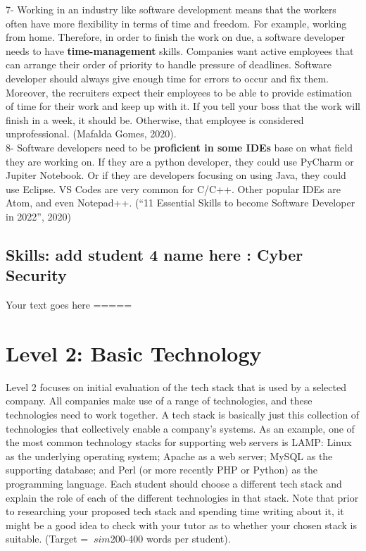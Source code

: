 \documentclass[a4paper, 11pt]{report}
\begin{document}
	7- Working in an industry like software development means that the workers often have more flexibility in terms of time and freedom. For example, working from home. Therefore, in order to finish the work on due, a software developer needs to have \textbf{time-management} skills. Companies want active employees that can arrange their order of priority to handle pressure of deadlines. Software developer should always give enough time for errors to occur and fix them. Moreover, the recruiters expect their employees to be able to provide estimation of time for their work and keep up with it. If you tell your boss that the work will finish in a week, it should be. Otherwise, that employee is considered unprofessional. (Mafalda Gomes, 2020). \nocite{one_seven}\\
	
	8- Software developers need to be \textbf{proficient in some IDEs} base on what field they are working on. If they are a python developer, they could use PyCharm or Jupiter Notebook. Or if they are developers focusing on using Java, they could use Eclipse. VS Codes are very common for C/C++. Other popular IDEs are Atom, and even Notepad++.  (“11 Essential Skills to become Software Developer in 2022”, 2020)\\
	
	\newpage
	\setlength{}
	
	
	
	
	

	
	\newpage
	\subsection{Skills: add student 4 name here : Cyber Security}
	Your text goes here
	=====
	\newpage
	\section{Level 2: Basic Technology}
	Level 2 focuses on initial evaluation of the tech stack that is used by a selected 
	company. All companies make use of a range of technologies, and these technologies 
	need to work together. A tech stack is basically just this collection of 
	technologies that collectively enable a company's systems. As an example, one of 
	the most common technology stacks for supporting web servers is LAMP: Linux as the 
	underlying operating system; Apache as a web server; MySQL as the supporting 
	database; and Perl (or more recently PHP or Python) as the programming language.
	Each student should choose a different tech stack and explain the role of each of 
	the different technologies in that stack. Note that prior to researching your 
	proposed tech stack and spending time writing about it, it might be a good idea to 
	check with your tutor as to whether your chosen stack is suitable. (Target = $\
	sim$200-400 words per student).
\end{document}
